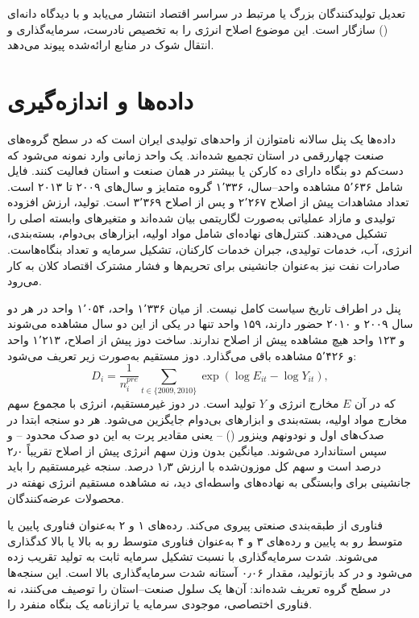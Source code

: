 \documentclass[11pt]{article}
\begin{document}
تعدیل تولیدکنندگان بزرگ یا مرتبط در سراسر اقتصاد انتشار می‌یابد و با دیدگاه دانه‌ای () \citet{gabaix2011} سازگار است. این موضوع اصلاح انرژی را به تخصیص نادرست، سرمایه‌گذاری و انتقال شوک در منابع ارائه‌شده پیوند می‌دهد.

\section{داده‌ها و اندازه‌گیری}

داده‌ها یک پنل سالانه نامتوازن از واحدهای تولیدی ایران است که در سطح گروه‌های صنعت چهاررقمی  در استان تجمیع شده‌اند. یک واحد زمانی وارد نمونه می‌شود که دست‌کم دو بنگاه دارای ده کارکن یا بیشتر در همان صنعت و استان فعالیت کنند. فایل شامل ۵٬۶۳۶ مشاهده واحد--سال، ۱٬۳۳۶ گروه متمایز و سال‌های ۲۰۰۹ تا ۲۰۱۳ است. تعداد مشاهدات پیش از اصلاح ۲٬۲۶۷ و پس از اصلاح ۳٬۳۶۹ است. تولید، ارزش افزوده تولیدی و مازاد عملیاتی به‌صورت لگاریتمی بیان شده‌اند و متغیرهای وابسته اصلی را تشکیل می‌دهند. کنترل‌های نهاده‌ای شامل مواد اولیه، ابزارهای بی‌دوام، بسته‌بندی، انرژی، آب، خدمات تولیدی، جبران خدمات کارکنان، تشکیل سرمایه و تعداد بنگاه‌هاست. صادرات نفت نیز به‌عنوان جانشینی برای تحریم‌ها و فشار مشترک اقتصاد کلان به کار می‌رود.

پنل در اطراف تاریخ سیاست کامل نیست. از میان ۱٬۳۳۶ واحد، ۱٬۰۵۴ واحد در هر دو سال ۲۰۰۹ و ۲۰۱۰ حضور دارند، ۱۵۹ واحد تنها در یکی از این دو سال مشاهده می‌شوند و ۱۲۳ واحد هیچ مشاهده پیش از اصلاح ندارند. ساخت دوز پیش از اصلاح، ۱٬۲۱۳ واحد و ۵٬۴۲۶ مشاهده باقی می‌گذارد. دوز مستقیم به‌صورت زیر تعریف می‌شود:
\begin{equation}
D_i=\frac{1}{n_i^{pre}}\sum_{t\in\{2009,2010\}}
\exp\!\left(\log E_{it}-\log Y_{it}\right),
\end{equation}
که در آن $E$ مخارج انرژی و $Y$ تولید است. در دوز غیرمستقیم، انرژی با مجموع سهم مخارج مواد اولیه، بسته‌بندی و ابزارهای بی‌دوام جایگزین می‌شود. هر دو سنجه ابتدا در صدک‌های اول و نودونهم وینزور () -- یعنی مقادیر پرت به این دو صدک محدود -- و سپس استاندارد می‌شوند. میانگین بدون وزن سهم انرژی پیش از اصلاح تقریباً ۲٫۰ درصد است و سهم کل موزون‌شده با ارزش ۱٫۳ درصد. سنجه غیرمستقیم را باید جانشینی برای وابستگی به نهاده‌های واسطه‌ای دید، نه مشاهده مستقیم انرژی نهفته در محصولات عرضه‌کنندگان.

فناوری از طبقه‌بندی صنعتی  پیروی می‌کند. رده‌های ۱ و ۲ به‌عنوان فناوری پایین یا متوسط رو به پایین و رده‌های ۳ و ۴ به‌عنوان فناوری متوسط رو به بالا یا بالا کدگذاری می‌شوند. شدت سرمایه‌گذاری با نسبت تشکیل سرمایه ثابت به تولید تقریب زده می‌شود و در کد بازتولید، مقدار ۰٫۰۶ آستانه شدت سرمایه‌گذاری بالا است. این سنجه‌ها در سطح گروه تعریف شده‌اند: آن‌ها یک سلول صنعت--استان را توصیف می‌کنند، نه فناوری اختصاصی، موجودی سرمایه یا ترازنامه یک بنگاه منفرد را.
\end{document}
